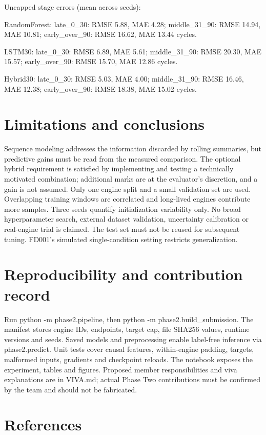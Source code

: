 \documentclass[conference]{IEEEtran}
\begin{document}
Uncapped stage errors (mean across seeds):

RandomForest: late\_0\_30: RMSE 5.88, MAE 4.28; middle\_31\_90: RMSE 14.94, MAE 10.81; early\_over\_90: RMSE 16.62, MAE 13.44 cycles.

LSTM30: late\_0\_30: RMSE 6.89, MAE 5.61; middle\_31\_90: RMSE 20.30, MAE 15.57; early\_over\_90: RMSE 15.70, MAE 12.86 cycles.

Hybrid30: late\_0\_30: RMSE 5.03, MAE 4.00; middle\_31\_90: RMSE 16.46, MAE 12.38; early\_over\_90: RMSE 18.38, MAE 15.02 cycles.

\section{Limitations and conclusions}

Sequence modeling addresses the information discarded by rolling summaries, but predictive gains must be read from the measured comparison. The optional hybrid requirement is satisfied by implementing and testing a technically motivated combination; additional marks are at the evaluator's discretion, and a gain is not assumed. Only one engine split and a small validation set are used. Overlapping training windows are correlated and long-lived engines contribute more samples. Three seeds quantify initialization variability only. No broad hyperparameter search, external dataset validation, uncertainty calibration or real-engine trial is claimed. The test set must not be reused for subsequent tuning. FD001's simulated single-condition setting restricts generalization.

\section{Reproducibility and contribution record}

Run python -m phase2.pipeline, then python -m phase2.build\_submission. The manifest stores engine IDs, endpoints, target cap, file SHA256 values, runtime versions and seeds. Saved models and preprocessing enable label-free inference via phase2.predict. Unit tests cover causal features, within-engine padding, targets, malformed inputs, gradients and checkpoint reloads. The notebook exposes the experiment, tables and figures. Proposed member responsibilities and viva explanations are in VIVA.md; actual Phase Two contributions must be confirmed by the team and should not be fabricated.

\section{References}
\end{document}
